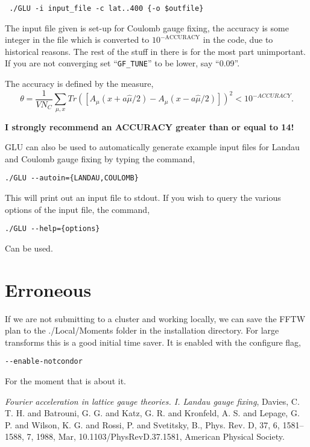 \documentclass[12pt]{article}
\begin{document}
\begin{verbatim}
 ./GLU -i input_file -c lat..400 {-o $outfile}
\end{verbatim}

The input file given is set-up for Coulomb gauge fixing, the accuracy is some integer in the file which is converted to
$10^{-\textrm{ACCURACY}}$ in the code, due to historical reasons. The rest of the stuff in there is for the
most part unimportant. If you are not converging set ``\verb|GF_TUNE|'' to be lower, say ``0.09''.

The accuracy is defined by the measure,
\begin{equation}
\theta=\frac{1}{V N_C}\sum_{\mu,x} Tr\left(\left[ A_\mu(x+a\hat{\mu}/2) -
A_\mu(x-a\hat{\mu}/2)
\right]\right)^2 < 10^{-ACCURACY}. \nonumber
\end{equation}

\textbf{I strongly recommend an ACCURACY greater than or equal to 14!}

GLU can also be used to automatically generate example input files for Landau and Coulomb gauge fixing by typing the command,
\begin{verbatim}
./GLU --autoin={LANDAU,COULOMB}
\end{verbatim}
This will print out an input file to stdout. If you wish to query the various options of the input file, the command,
\begin{verbatim}
./GLU --help={options}
\end{verbatim}
Can be used.

\section{Erroneous}

If we are not submitting to a cluster and working locally, we can save the FFTW plan to the ./Local/Moments folder in
the installation directory. For large transforms this is a good initial time saver. It is enabled with the configure
flag,
\begin{verbatim}
--enable-notcondor
\end{verbatim}

For the moment that is about it.

\begin{thebibliography}{9}
  
  \emph{Fourier acceleration in lattice gauge theories. I. Landau gauge fixing},
  Davies, C. T. H. and Batrouni, G. G. and Katz, G. R. and Kronfeld, A. S. and Lepage, G. P. and Wilson, K. G. and Rossi, P.  and Svetitsky, B.,
  Phys. Rev. D,
  37,
  6,
  1581--1588,
  7,
  1988,
  Mar,
  10.1103/PhysRevD.37.1581,
  American Physical Society.

\end{thebibliography}
\end{document}
